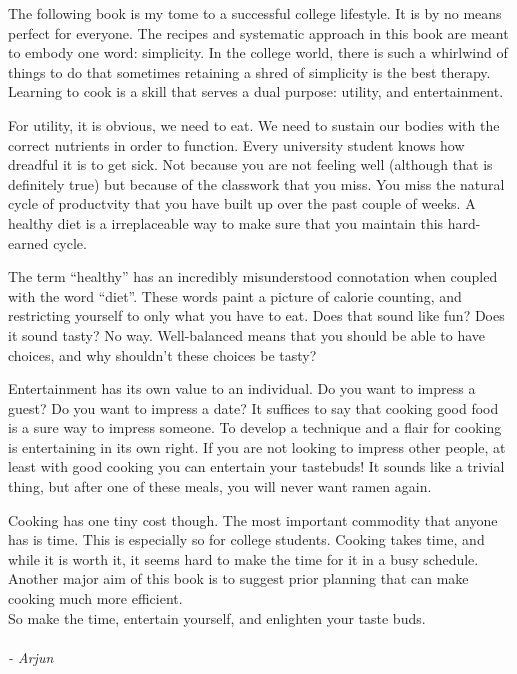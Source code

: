 

The following book is my tome to a successful college lifestyle. It is by no means perfect for everyone. The recipes and systematic approach in this book are meant to embody one word: simplicity. In the college world, there is such a whirlwind of things to do that sometimes retaining a shred of simplicity is the best therapy. Learning to cook is a skill that serves a dual purpose: utility, and entertainment. 

For utility, it is obvious, we need to eat. We need to sustain our bodies with the correct nutrients in order to function. Every university student knows how dreadful it is to get sick. Not because you are not feeling well (although that is definitely true) but because of the classwork that you miss. You miss the natural cycle of productvity that you have built up over the past couple of weeks. A healthy diet is a irreplaceable way to make sure that you maintain this hard-earned cycle. 

The term ``healthy'' has an incredibly misunderstood connotation when coupled with the word ``diet''. These words paint a picture of calorie counting, and restricting yourself to only what you have to eat. Does that sound like fun? Does it sound tasty? No way. Well-balanced means that you should be able to have choices, and why shouldn't these choices be tasty? 

Entertainment has its own value to an individual. Do you want to impress a guest? Do you want to impress a date? It suffices to say that cooking good food is a sure way to impress someone. To develop a technique and a flair for cooking is entertaining in its own right. If you are not looking to impress other people, at least with good cooking you can entertain your tastebuds! It sounds like a trivial thing, but after one of these meals, you will never want ramen again. 

Cooking has one tiny cost though. The most important commodity that anyone has is time. This is especially so for college students. Cooking takes time, and while it is worth it, it seems hard to make the time for it in a busy schedule. Another major aim of this book is to suggest prior planning that can make cooking much more efficient.\\
So make the time, entertain yourself, and enlighten your taste buds.
\\\\
\textit{- Arjun} 

